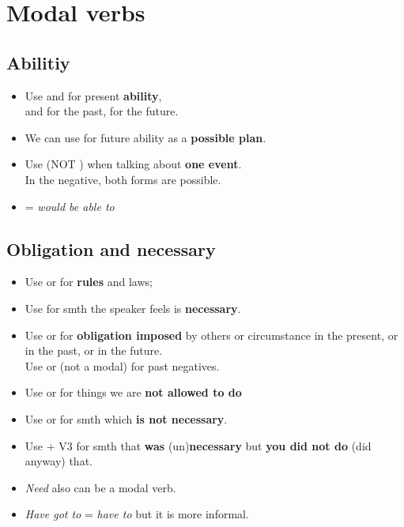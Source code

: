 \section{Modal verbs}

\subsection{Abilitiy}
\begin{itemize}
    \item Use  and  for present \textbf{ability},\\
     and  for the past,  for the future.
    \item[\doot] We can use  for future ability as a \textbf{possible plan}.
    \item[\doot] Use  (NOT ) when talking about \textbf{one event}.\\
    In the negative, both forms are possible.
    \item[\doot]  = \textit{would be able to}
\end{itemize}

\subsection{Obligation and necessary}
\begin{itemize}
    \item Use  or  for \textbf{rules} and laws;
    \item Use  for smth the speaker feels is \textbf{necessary}.
    \item Use  or  for \textbf{obligation imposed} by others or circumstance in the present,
     or  in the past,  or  in the future.\\
    Use  or  (not a modal) for past negatives.
    \item Use  or  for things we are \textbf{not allowed to do}
    \item Use  or  for smth which \textbf{is not necessary}.
    \item[\doot] Use  + V3
    for smth that \textbf{was} (un)\textbf{necessary} but \textbf{you did not do} (did anyway) that.
    \item[\aast] \textit{Need} also can be a modal verb.
    \item[\aast] \textit{Have got to} = \textit{have to} but it is more informal.
\end{itemize}

